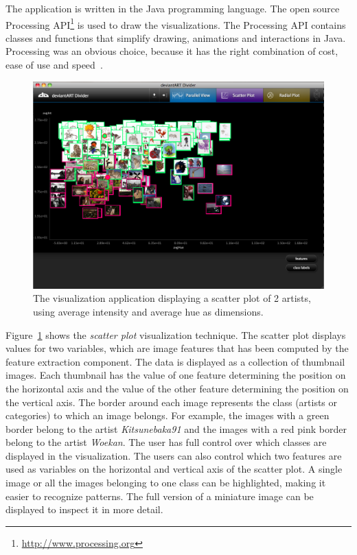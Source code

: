 The application is written in the Java programming language.
The open source Processing API\footnote{\url{http://www.processing.org}} is used to draw the visualizations.
The Processing API contains classes and functions that simplify drawing, animations and interactions in Java.
Processing was an obvious choice, because it has the right combination of cost, ease of use and speed~\cite{fry08}.

\begin{figure}[htb]
  \centering
  \includegraphics[width=1\linewidth]{img/visualization_scatter.png}
  \caption{The visualization application displaying a scatter plot of 2 artists, using average intensity and average hue as dimensions.}
  \label{fig:visualization_scatter}
\end{figure}

Figure~\ref{fig:visualization_scatter} shows the \textit{scatter plot} visualization technique.
The scatter plot displays values for two variables, which are image features that has been computed by the feature extraction component.
The data is displayed as a collection of thumbnail images.
Each thumbnail has the value of one feature determining the position on the horizontal axis and the value of the other feature determining the position on the vertical axis.
The border around each image represents the class (artists or categories) to which an image belongs.
For example, the images with a green border belong to the artist \textit{Kitsunebaka91} and the images with a red pink border belong to the artist \textit{Woekan}.
The user has full control over which classes are displayed in the visualization.
The users can also control which two features are used as variables on the horizontal and vertical axis of the scatter plot.
A single image or all the images belonging to one class can be highlighted, making it easier to recognize patterns.
The full version of a miniature image can be displayed to inspect it in more detail.

